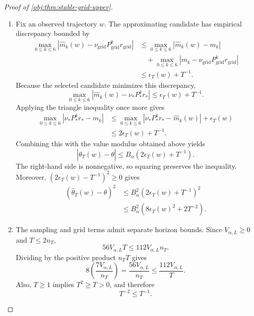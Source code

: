 \documentclass[11pt]{article}
\begin{document}
\begin{proof}[Proof of \cref{obj:thm:stable-grid-upper}]
\begin{enumerate}
\item Fix an observed trajectory \(w\). The approximating candidate has empirical discrepancy bounded by
\[
\begin{aligned}
\max_{0\le k\le6}
|\widehat m_k(w)-\nu_{\mathrm{grid}}P_{\mathrm{grid}}^kr_{\mathrm{grid}}|
&\le
\max_{0\le k\le6}|\widehat m_k(w)-m_k|\\
&\quad+
\max_{0\le k\le6}
|m_k-\nu_{\mathrm{grid}}P_{\mathrm{grid}}^kr_{\mathrm{grid}}|\\
&\le\epsilon_T(w)+T^{-1}.
\end{aligned}
\]
Because the selected candidate minimizes this discrepancy,
\[
\max_{0\le k\le6}
|\widehat m_k(w)-\nu_*P_*^kr_*|
\le\epsilon_T(w)+T^{-1}.
\]
Applying the triangle inequality once more gives
\[
\begin{aligned}
\max_{0\le k\le6}|\nu_*P_*^kr_*-m_k|
&\le
\max_{0\le k\le6}|\nu_*P_*^kr_*-\widehat m_k(w)|
+\epsilon_T(w)\\
&\le2\epsilon_T(w)+T^{-1}.
\end{aligned}
\]
Combining this with the value modulus obtained above yields
\[
|\widehat\theta_T(w)-\theta|
\le
B_\alpha(2\epsilon_T(w)+T^{-1}).
\]
The right-hand side is nonnegative, so squaring preserves the inequality. Moreover,
\((2\epsilon_T(w)-T^{-1})^2\ge0\) gives
\[
\begin{aligned}
(\widehat\theta_T(w)-\theta)^2
&\le
B_\alpha^2(2\epsilon_T(w)+T^{-1})^2\\
&\le
B_\alpha^2\left(8\epsilon_T(w)^2+2T^{-2}\right).
\end{aligned}
\]

\item The sampling and grid terms admit separate horizon bounds. Since
\(V_{\alpha,L}\ge0\) and \(T\le2n_T\),
\[
56V_{\alpha,L}T
\le112V_{\alpha,L}n_T.
\]
Dividing by the positive product \(n_TT\) gives
\[
8\left(\frac{7V_{\alpha,L}}{n_T}\right)
=
\frac{56V_{\alpha,L}}{n_T}
\le
\frac{112V_{\alpha,L}}T.
\]
Also, \(T\ge1\) implies \(T^2\ge T>0\), and therefore
\[
T^{-2}\le T^{-1}.
\]


\end{enumerate}
\end{proof}
\end{document}
